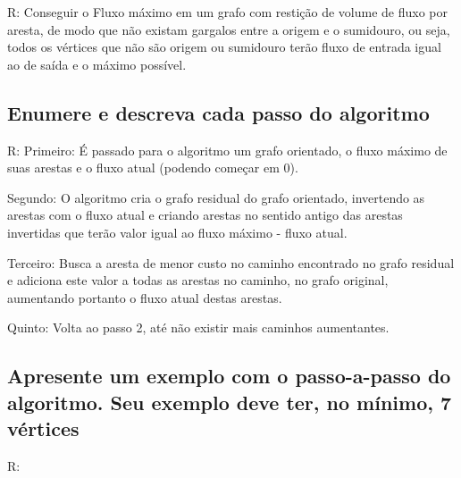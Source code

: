 \documentclass[final,3p,12pt]{elsarticle}
\begin{document}
			R: Conseguir o Fluxo máximo em um grafo com restição de volume de fluxo por aresta, de modo que não existam gargalos entre a origem e o sumidouro, ou seja, todos os vértices que não são origem ou sumidouro terão fluxo de entrada igual ao de saída e o máximo possível.

		\subsection{Enumere e descreva cada passo do algoritmo}

			R: 	Primeiro:
				É passado para o algoritmo um grafo orientado, o fluxo máximo de suas arestas e o fluxo atual (podendo começar em 0).

				Segundo:
				O algoritmo cria o grafo residual do grafo orientado, invertendo as arestas com o fluxo atual e criando arestas no sentido antigo das arestas invertidas que terão valor igual ao fluxo máximo - fluxo atual.

				Terceiro:
				Busca a aresta de menor custo no caminho encontrado no grafo residual e adiciona este valor a todas as arestas no caminho, no grafo original, aumentando portanto o fluxo atual destas arestas.

				Quinto:
				Volta ao passo 2, até não existir mais caminhos aumentantes.

		\subsection{Apresente um exemplo com o passo-a-passo do algoritmo. Seu exemplo deve ter, no mínimo, 7 vértices}

			R:
			\begin{figure}[!ht]
				\centering
			\end{figure}
\end{document}
